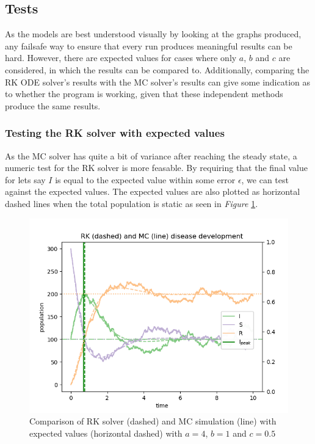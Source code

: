\subsection{Tests}
As the models are best understood visually by looking at the graphs produced, any failsafe way to ensure that every run produces meaningful results can be hard.
However, there are expected values for cases where only $a$, $b$ and $c$ are considered, in which the results can be compared to.
Additionally, comparing the RK ODE solver's results with the MC solver's results can give some indication as to whether the program is working, given that these independent methods produce the same results.


\subsubsection{Testing the RK solver with expected values}
As the MC solver has quite a bit of variance after reaching the steady state, a numeric test for the RK solver is more feasable.
By requiring that the final value for lets say $I$ is equal to the expected value within some error $\epsilon$, we can test against the expected values.
The expected values are also plotted as horizontal dashed lines when the total population is static as seen in \textit{Figure} \ref{fig:comparetest}.

\begin{figure}[]
    \centering
    \includegraphics[scale=0.55]{plots/Compare_getstd_a_4_b_1_c_0.5.png}
    \caption{Comparison of RK solver (dashed) and MC simulation (line) with expected values (horizontal dashed) with $a=4$, $b=1$ and $c=0.5$}
    \label{fig:comparetest}
\end{figure}

